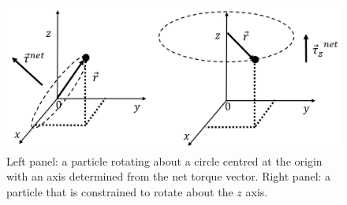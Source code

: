 \begin{figure}[!htbp]
\centering
\includegraphics[width=1\linewidth]{files/pointaxis-2f5570c49935cacc05f9e8ef0ae78609.png}
\caption[]{Left panel: a particle rotating about a circle centred at the origin with an axis determined from the net torque vector. Right panel: a particle that is constrained to rotate about the $z$ axis.}
\label{fig:rotationaldynamics:pointaxis}
\end{figure}

